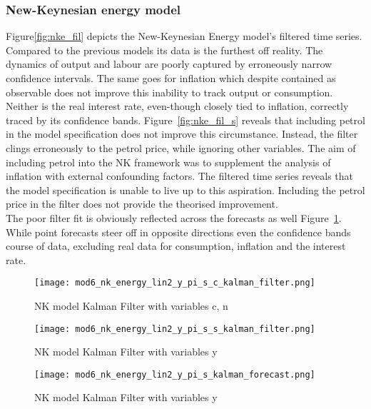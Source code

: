 \documentclass[12pt,a4paper,english]{article} %
\begin{document}
	\subsubsection{New-Keynesian energy model}
	Figure\ref{fig:nke_fil} depicts the New-Keynesian Energy model's filtered time series. Compared to the previous models its data is the furthest off reality. The dynamics of output and labour are poorly captured by erroneously narrow confidence intervals. The same goes for inflation which despite contained as observable does not improve this inability to track output or consumption. Neither is the real interest rate, even-though closely tied to inflation, correctly traced by its confidence bands. Figure~\ref{fig:nke_fil_s} reveals that including petrol in the model specification does not improve this circumstance. Instead, the filter clings erroneously to the petrol price, while ignoring other variables. The aim of including petrol into the NK framework was to supplement the analysis of inflation with external confounding factors. The filtered time series reveals that the model specification is unable to live up to this aspiration. Including the petrol price in the filter does not provide the theorised improvement.\\
	
	The poor filter fit is obviously reflected across the forecasts as well Figure~\ref{fig:nke_for}. While point forecasts steer off in opposite directions even the confidence bands course of data, excluding real data for consumption, inflation and the interest rate.
	\begin{figure}[H]
		\begin{center}
			\texttt{[image: mod6\_nk\_energy\_lin2\_y\_pi\_s\_c\_kalman\_filter.png]}
			\caption{NK model Kalman Filter with variables c, n}\label{fig:nke_fil}			
			\texttt{[image: mod6\_nk\_energy\_lin2\_y\_pi\_s\_s\_kalman\_filter.png]}
			\caption{NK model Kalman Filter with variables y}\label{fig:nke_fil_s}
			\texttt{[image: mod6\_nk\_energy\_lin2\_y\_pi\_s\_kalman\_forecast.png]}
			\caption{NK model Kalman Filter with variables y}\label{fig:nke_for}
		\end{center}
	\end{figure}
\end{document}

